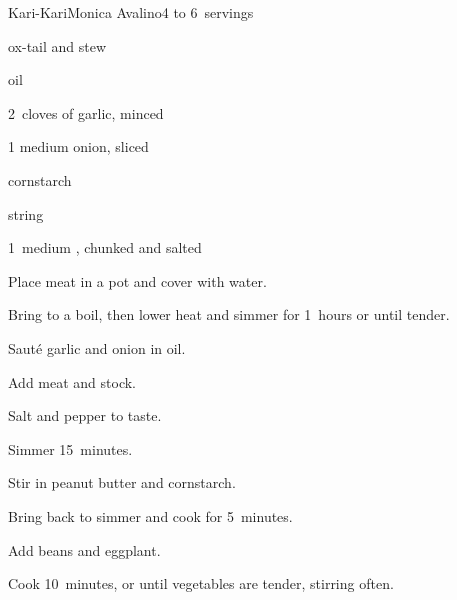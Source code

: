 \begin{recipe}{Kari-Kari}{Monica Avalino}{4 to 6~servings}

\begin{ingredients}
\item \lbs{2 \half} ox-tail and stew 
\item {} oil
\item 2~cloves of garlic, minced
\item 1 medium onion, sliced
\item {} 
\item {} cornstarch
\item \lbs{\half} string 
\item 1~medium , chunked and salted
\end{ingredients}

\begin{directions}
\item Place meat in a pot and cover with water.
\item Bring to a boil, then lower heat and simmer for 1\half~hours or until tender.
\item Saut\'e garlic and onion in oil.
\item Add meat and stock.
\item Salt and pepper to taste.
\item Simmer 15~minutes.
\item Stir in peanut butter and cornstarch.
\item Bring back to simmer and cook for 5~minutes.
\item Add beans and eggplant.
\item Cook 10~minutes, or until vegetables are tender, stirring often.
\end{directions}

\end{recipe}
